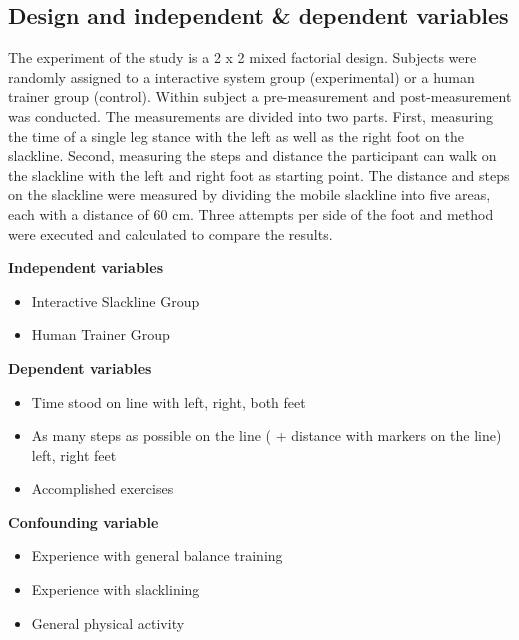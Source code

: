 \todo{[Figure]}

\subsection{Design and independent \& dependent variables}\label{6_variables}
The experiment of the study is a 2 x 2 mixed factorial design.
Subjects were randomly assigned to a interactive system group (experimental) or a human trainer group (control).
Within subject a pre-measurement and post-measurement was conducted.
The measurements are divided into two parts.
First, measuring the time of a single leg stance with the left as well as the right foot on the slackline.
Second, measuring the steps and distance the participant can walk on the slackline with the left and right foot as starting point.
The distance and steps on the slackline were measured by dividing the mobile slackline into five areas, each with a distance of 60 cm.
Three attempts per side of the foot and method were executed and calculated to compare the results.

\textbf{Independent variables}
\begin{itemize}
\item Interactive Slackline Group
\item Human Trainer Group
\end{itemize}

\textbf{Dependent variables}
\begin{itemize}
\item Time stood on line with left, right, both feet
\item As many steps as possible on the line ( + distance with markers on the line) left, right feet
\item Accomplished exercises
\end{itemize}

\textbf{Confounding variable}
\begin{itemize}
\item Experience with general balance training
\item Experience with slacklining
\item General physical activity
\end{itemize}


